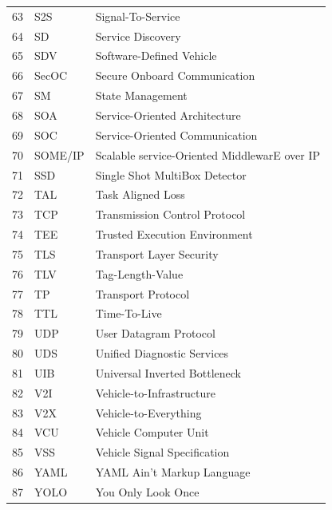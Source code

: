 \begin{longtable}{|c|l|l|}
    63 & S2S & Signal-To-Service \\
    64 & SD & Service Discovery \\
    65 & SDV & Software-Defined Vehicle \\
    66 & SecOC & Secure Onboard Communication \\
    67 & SM & State Management \\
    68 & SOA & Service-Oriented Architecture \\
    69 & SOC & Service-Oriented Communication \\
    70 & SOME/IP & Scalable service-Oriented MiddlewarE over IP \\
    71 & SSD & Single Shot MultiBox Detector \\
    72 & TAL & Task Aligned Loss \\
    73 & TCP & Transmission Control Protocol \\
    74 & TEE & Trusted Execution Environment \\
    75 & TLS & Transport Layer Security \\
    76 & TLV & Tag-Length-Value \\
    77 & TP & Transport Protocol \\
    78 & TTL & Time-To-Live \\
    79 & UDP & User Datagram Protocol \\
    80 & UDS & Unified Diagnostic Services \\
    81 & UIB & Universal Inverted Bottleneck \\
    82 & V2I & Vehicle-to-Infrastructure \\
    83 & V2X & Vehicle-to-Everything \\
    84 & VCU & Vehicle Computer Unit \\
    85 & VSS & Vehicle Signal Specification \\
    86 & YAML & YAML Ain't Markup Language \\
    87 & YOLO & You Only Look Once \\
\end{longtable}

\clearpage
